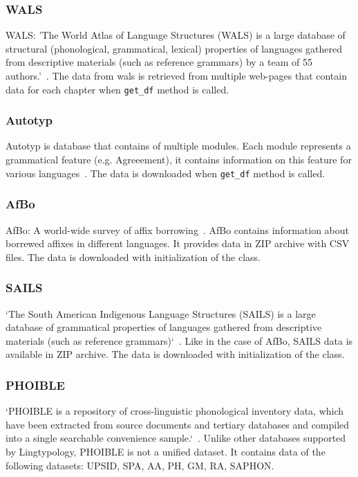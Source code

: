 \documentclass[a4paper,12pt]{article}
\begin{document}
\subsubsection{WALS}
WALS: 'The World Atlas of Language Structures (WALS) is a large database of structural (phonological, grammatical, lexical) properties of languages gathered from descriptive materials (such as reference grammars) by a team of 55 authors.'~\parencite{wals}. The data from wals is retrieved from multiple web-pages that contain data for each chapter when \texttt{get\_df} method is called.

\subsubsection{Autotyp}
Autotyp is database that contains of multiple modules. Each module represents a grammatical feature (e.g. Agreeement), it contains information on this feature for various languages~\parencite{autotyp}. The data is downloaded when \texttt{get\_df} method is called.

\subsubsection{AfBo}
AfBo: A world-wide survey of affix borrowing~\parencite{afbo}. AfBo contains information about borrewed affixes in different languages. It provides data in ZIP archive with CSV files. The data is downloaded with initialization of the class.

\subsubsection{SAILS}
`The South American Indigenous Language Structures (SAILS) is a large database of grammatical properties of languages gathered from descriptive materials (such as reference grammars)`~\parencite{sails}. Like in the case of AfBo, SAILS data is available in ZIP archive. The data is downloaded with initialization of the class.

\subsubsection{PHOIBLE}
`PHOIBLE is a repository of cross-linguistic phonological inventory data, which have been extracted from source documents and tertiary databases and compiled into a single searchable convenience sample.`~\parencite{phoible}.
Unlike other databases supported by Lingtypology, PHOIBLE is not a unified dataset. It contains data of the following datasets: UPSID, SPA, AA, PH, GM, RA, SAPHON.
\end{document}
